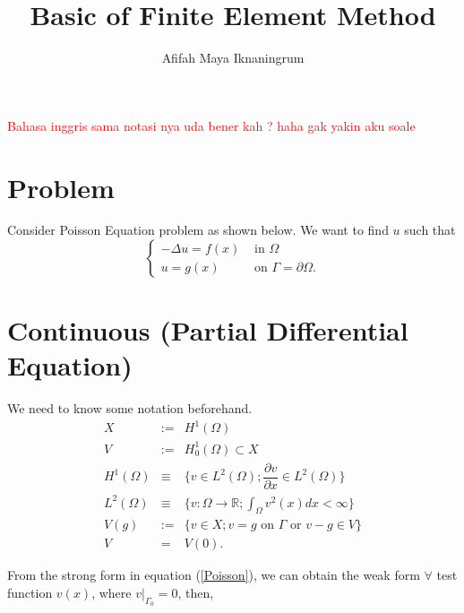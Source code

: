 \documentclass[]{report}
\title{Basic of Finite Element Method}
\author{Afifah Maya Iknaningrum}
\begin{document}

\textcolor{red}{Bahasa inggris sama notasi nya uda bener kah ? haha gak yakin aku soale}

\section{Problem}
Consider Poisson Equation problem as shown below. We want to find $ u $ such that
\begin{equation}\label{Poisson}
\begin{cases}
-\Delta u = f(x) & \text{ in } \Omega \\
u = g(x) & \text{ on } \Gamma = \partial \Omega.
\end{cases}
\end{equation}

\section{Continuous (Partial Differential Equation)}
We need to know some notation beforehand.
\begin{eqnarray}\label{notation} \nonumber
X &:=& H^{1}(\Omega) \\ \nonumber
V &:=& H^{1}_{0}(\Omega) \subset X \\ \nonumber
H^{1}(\Omega) &\equiv& \{ v \in L^{2}(\Omega) ; \dfrac{\partial v}{\partial x} \in L^{2}(\Omega) \} \\ \nonumber
L^{2}(\Omega) &\equiv& \{ v: \Omega \rightarrow \mathbb{R} ;  \int_{\Omega} v^{2}(x) dx < \infty \} \\ \nonumber
V(g) &:=& \{ v \in X ; v=g \text{ on } \Gamma \text{ or } v-g \in V \} \\ \nonumber
V &=& V(0).
\end{eqnarray}

From the strong form in equation (\ref{Poisson}), we can obtain the weak form
$ \forall $ test function $ v(x) $, where $ v|_{\Gamma_0} = 0 $, then,
\end{document}
